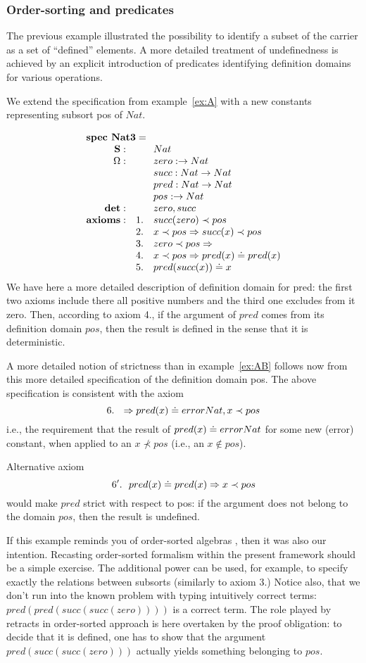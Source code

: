 \documentclass[10pt]{article}
\begin{document}
\subsubsection{Order-sorting and predicates}
The previous example illustrated the possibility to identify a subset of the
carrier as a set of ``defined'' elements. 
A more detailed treatment of undefinedness is achieved by
an explicit introduction of predicates identifying definition domains for various operations.

\begin{example}\label{ex:CA}
We extend the specification from example~\ref{ex:A} with a new constants
representing subsort pos of $Nat$.

\[ \spec{
 \tit{\mbox{\bf spec\ Nat3} =} \\
	\Sorts:	
		&& Nat \\
	\Ops:
		&& zero: \to Nat\\
		&& succ: Nat \to Nat\\
		&& pred: Nat \to Nat\\	
 		&& pos: \to Nat\\ 
	{\bf det}:
		&& zero, succ \\
	{\bf axioms}: 	
		&1.& succ(zero) \prec pos \\
		&2.& x\prec pos \To succ(x)\prec pos \\
		&3.& zero \prec pos \To \\
		&4.& x\prec pos \To pred(x)\eleq pred(x) \\
        	&5.& pred(succ(x)) \eleq x 
}\] 
We have here a more detailed description of definition domain for pred: the
	first two axioms include there all positive numbers and the third one
	excludes from it zero.
Then, according to axiom 4., if the argument of $pred$ comes from its definition
domain $pos$, then the result is defined in the sense that it is
deterministic. 

A more detailed notion of strictness than in example~\ref{ex:AB} follows now from
this more detailed specification of the definition domain pos.
The above
specification is consistent with the axiom
\[ 6.\ \ \Rightarrow pred(x)\mathrel{\dot{=} } errorNat, x\prec pos \]
i.e., the requirement that the
result of $pred(x)\mathrel{\dot{=} } errorNat$ for some new (error) constant, when applied
to an $x\not\prec pos$ (i.e., an $x\not\in pos$).

Alternative axiom
\[ 6'.\ \ pred(x)\mathrel{\dot{=} } pred(x) \Rightarrow x\prec pos \]
would make $pred$ strict with respect to pos: 
 if the argument does not belong to the domain $pos$,
then the result is undefined.
\end{example}
%
If this example reminds you of order-sorted algebras \cite{oxford}, then it was also our
intention. Recasting
order-sorted formalism within the present framework should be a simple
exercise. The additional power can be used, for example, to specify exactly
the relations between subsorts (similarly to axiom 3.) Notice also, that we
don't run into the known problem with typing intuitively correct terms:
$pred(pred(succ(succ(zero))))$ is a correct term. The role played by retracts in
order-sorted approach is here overtaken by the proof obligation: to decide
that it is defined, one has to show that
the argument $pred(succ(succ(zero)))$ actually yields something belonging to $pos$.
\end{document}
